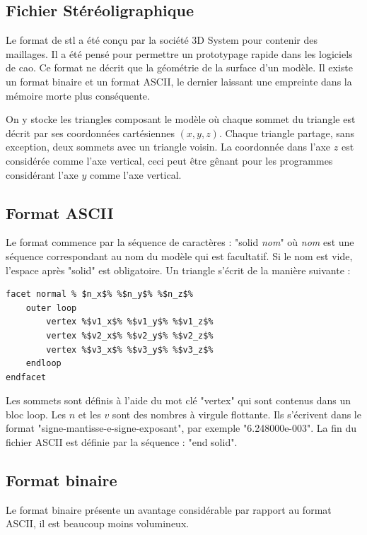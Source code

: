\subsection{Fichier Stéréoligraphique}

Le format de \gls{stl} a été conçu par la société 3D System pour contenir des maillages.
Il a été pensé pour permettre un prototypage rapide dans les logiciels de \gls{cao}.
Ce format ne décrit que la géométrie de la surface d'un modèle.
Il existe un format binaire et un format ASCII, le dernier laissant une empreinte dans la mémoire morte plus conséquente.

On y stocke les triangles composant le modèle où chaque sommet du triangle est décrit par ses coordonnées cartésiennes $(x,y,z)$. Chaque triangle partage, sans exception, deux sommets avec un triangle voisin.
La coordonnée dans l'axe $z$ est considérée comme l'axe vertical, ceci peut être gênant pour les programmes considérant l'axe $y$ comme l'axe vertical.

\subsection{Format ASCII}

Le format commence par la séquence de caractères : "solid \textit{nom}" où \textit{nom} est une séquence correspondant au nom du modèle qui est facultatif.
Si le nom est vide, l'espace après "solid" est obligatoire.
Un triangle s'écrit de la manière suivante :
\begin{minipage}{\linewidth}
\begin{lstlisting}[frame=single, escapechar=\%]
facet normal % $n_x$% %$n_y$% %$n_z$%
    outer loop
        vertex %$v1_x$% %$v1_y$% %$v1_z$%
        vertex %$v2_x$% %$v2_y$% %$v2_z$%
        vertex %$v3_x$% %$v3_y$% %$v3_z$%
    endloop
endfacet
\end{lstlisting}
\end{minipage}
Les sommets sont définis à l'aide du mot clé "vertex" qui sont contenus dans un bloc loop. Les $n$ et les $v$ sont des nombres à virgule flottante.
Ils s'écrivent dans le format "signe-mantisse-e-signe-exposant", par exemple "6.248000e-003".
La fin du fichier ASCII est définie par la séquence : "end solid".

\subsection{Format binaire}

Le format binaire présente un avantage considérable par rapport au format ASCII, il est beaucoup moins volumineux. 

